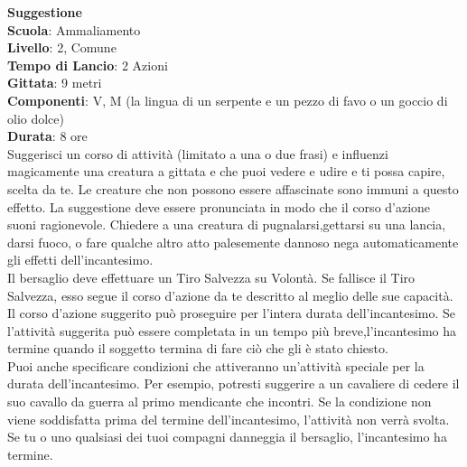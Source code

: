 \begin{multicols}{2}
\medskip\textbf{Suggestione}\\
\textbf{Scuola}: Ammaliamento\\
\textbf{Livello}: 2, Comune\\
\textbf{Tempo di Lancio}: 2 Azioni\\
\textbf{Gittata}: 9 metri\\
\textbf{Componenti}: V, M (la lingua di un serpente e un pezzo di favo o un goccio di olio dolce)\\
\textbf{Durata}: 8 ore \\
Suggerisci un corso di attività (limitato a una o due frasi) e influenzi magicamente una creatura a gittata e che puoi vedere e udire e ti possa capire, scelta da te. Le creature che non possono essere affascinate sono immuni a questo effetto. La suggestione deve essere pronunciata in modo che il corso d'azione suoni ragionevole. Chiedere a una creatura di pugnalarsi,gettarsi su una lancia, darsi fuoco, o fare qualche altro atto palesemente dannoso nega automaticamente gli effetti dell'incantesimo.\\
Il bersaglio deve effettuare un Tiro Salvezza su Volontà. Se fallisce il Tiro Salvezza, esso segue il corso d'azione da te descritto al meglio delle sue capacità. Il corso d'azione suggerito può proseguire per l'intera durata dell'incantesimo. Se l'attività suggerita può essere completata in un tempo più breve,l'incantesimo ha termine quando il soggetto termina di fare ciò che gli è stato chiesto.\\
Puoi anche specificare condizioni che attiveranno un'attività speciale per la durata dell'incantesimo. Per esempio, potresti suggerire a un cavaliere di cedere il suo cavallo da guerra al primo mendicante che incontri. Se la condizione non viene soddisfatta prima del termine dell'incantesimo, l'attività non verrà svolta. Se tu o uno qualsiasi dei tuoi compagni danneggia il bersaglio, l'incantesimo ha termine.


\end{multicols}
